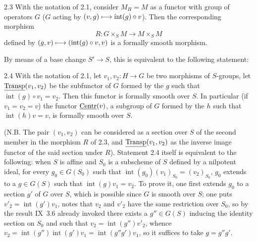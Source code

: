 \begin{corollary}{2.3}\label{XI.2.3}
With the notation of 2.1, consider $M_H=M$ as a functor with group of operators $G$ ($G$ acting by $(v,g)\longmapsto\operatorname{int}(g)\circ v$). Then the corresponding morphism
\[
R:G\times_S M\to M\times_S M
\]
defined by $(g,v)\longmapsto(\operatorname{int}(g)\circ v,v)$ is a formally smooth morphism.
\end{corollary}
By means of a base change $S'\to S$, this is equivalent to the following statement:
\begin{corollary}{2.4}\label{XI.2.4}
With the notation of 2.1, let $v_1,v_2:H\to G$ be two morphisms of $S$-groups, let $\underline{\operatorname{Transp}}(v_1,v_2)$ be the subfunctor of $G$ formed by the $g$ such that $\operatorname{int}(g)\circ v_1=v_2$. Then this functor is formally smooth over $S$. In particular (if $v_1=v_2=v$) the functor $\underline{\mathrm{Centr}}(v)$, a subgroup of $G$ formed by the $h$ such that $\operatorname{int}(h)v=v$, is formally smooth over $S$.
\end{corollary}
(N.B. The pair $(v_1,v_2)$ can be considered as a section over $S$ of the second member in the morphism $R$ of 2.3, and $\underline{\operatorname{Transp}}(v_1,v_2)$ as the inverse image functor of the said section under $R$). Statement 2.4 itself is equivalent to the following: when $S$ is affine and $S_0$ is a subscheme of $S$ defined by a nilpotent ideal, for every $g_0\in G(S_0)$ such that $\operatorname{int}(g_0)(v_1)_{S_0}=(v_2)_{S_0}$, $g_0$ extends to a $g\in G(S)$ such that $\operatorname{int}(g)v_1=v_2$. To prove it, one first extends $g_0$ to a section $g'$ of $G$ over $S$, which is possible since $G$ is smooth over $S$; one puts $v'_2=\operatorname{int}(g')v_1$, notes that $v_2$ and $v'_2$ have the same restriction over $S_0$, so by the result IX~3.6 already invoked there exists a $g''\in G(S)$ inducing the identity section on $S_0$ and such that $v_2=\operatorname{int}(g'')v'_2$, whence $v_2=\operatorname{int}(g'')\operatorname{int}(g')v_1=\operatorname{int}(g''g')v_1$, so it suffices to take $g=g''g'$.

